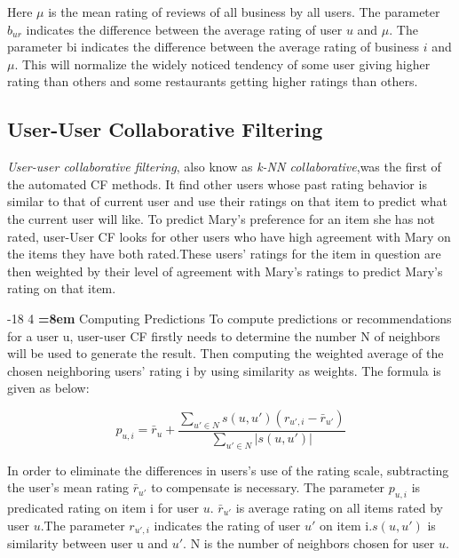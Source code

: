 \documentclass{llncs}
\makeatletter
\renewcommand\subsubsection{\@startsection{subsubsection}{3}{\z@}%
	{-18\p@ \@plus -4\p@ \@minus -4\p@}%
	{4\p@ \@plus 2\p@ \@minus 2\p@}%
	{\normalfont\normalsize\bfseries\boldmath
		\rightskip=\z@ \@plus 8em\pretolerance=10000 }}
\makeatother
\begin{document}
Here $\mu$ is the mean rating of reviews of all business by all users. The parameter $b_{ur}$ indicates the difference between the average rating of user $u$ and $\mu$. The parameter bi indicates the difference between the average rating of business $i$ and $\mu$. This will normalize the widely noticed tendency of some user giving higher rating than others and some restaurants getting higher ratings than others.


\subsection{User-User Collaborative Filtering}
\textit{User-user collaborative filtering}, also know as \textit{k-NN collaborative},was the first of the automated CF methods. It find other users whose past rating behavior is similar to that of current user and
use their ratings on that item to predict what the current user will like. To predict Mary's preference for an item she has not rated, user-User CF looks for other users who have high agreement with Mary on the items they have both rated.These users’ ratings for the item in question are then weighted by their level of agreement with Mary’s ratings to predict Mary's rating on that item. 

\subsubsection{Computing Predictions}
To compute predictions or recommendations for a user u, user-user CF firstly needs to determine the number N of neighbors will be used to generate the result. Then computing the weighted average of the chosen neighboring users' rating i by using similarity as weights. The formula is given as below:

\begin{equation}
p_{u,i} ={\bar r_{u}}  + \frac
{\sum\nolimits_{u' \in N} s(u,u')(r_{u',i} - {\bar r_{u'}})} 
{\sum\nolimits_{u' \in N} |s(u,u')|}
\end{equation}

In order to eliminate the differences in users's use of the rating scale, subtracting the user's mean rating ${\bar r_{u'}}$ to compensate is necessary.   The parameter $p_{u,i}$ is predicated rating on item i for user $u$.  ${\bar r_{u'}}$ is average rating on all items rated by user $u$.The parameter $r_{u',i}$ indicates the rating of user $u'$ on item i.$s(u,u')$ is similarity between user u and $u'$. N is the number of neighbors chosen for user $u$.  
\end{document}
